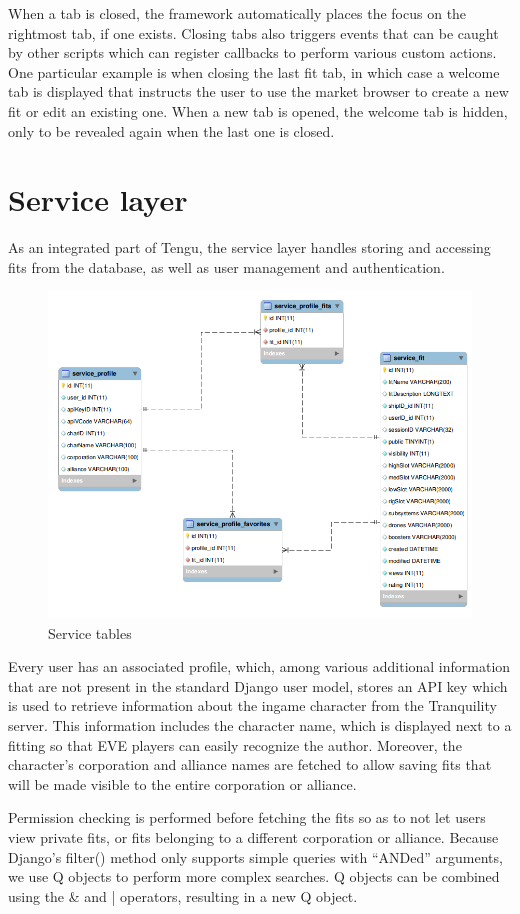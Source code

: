 When a tab is closed, the framework automatically places the focus on the rightmost tab, if one exists. Closing tabs also triggers events that can be caught by other scripts which can register callbacks to perform various custom actions. One particular example is when closing the last fit tab, in which case a welcome tab is displayed that instructs the user to use the market browser to create a new fit or edit an existing one. When a new tab is opened, the welcome tab is hidden, only to be revealed again when the last one is closed.

\section{Service layer}
As an integrated part of Tengu, the service layer handles storing and accessing fits from the database, as well as user management and authentication.

\begin{figure}[h]
\centering
\includegraphics[width=0.7\linewidth]{src/img/service}
\caption{Service tables}
\label{fig:service}
\end{figure}

Every user has an associated profile, which, among various additional information that are not present in the standard Django user model, stores an API key which is used to retrieve information about the ingame character from the Tranquility server. This information includes the character name, which is displayed next to a fitting so that EVE players can easily recognize the author. Moreover, the character’s corporation and alliance names are fetched to allow saving fits that will be made visible to the entire corporation or alliance.

Permission checking is performed before fetching the fits so as to not let users view private fits, or fits belonging to a different corporation or alliance. Because Django’s filter() method \cite{filter} only supports simple queries with “ANDed” arguments, we use Q objects \cite{q} to perform more complex searches. Q objects can be combined using the \& and | operators, resulting in a new Q object.

